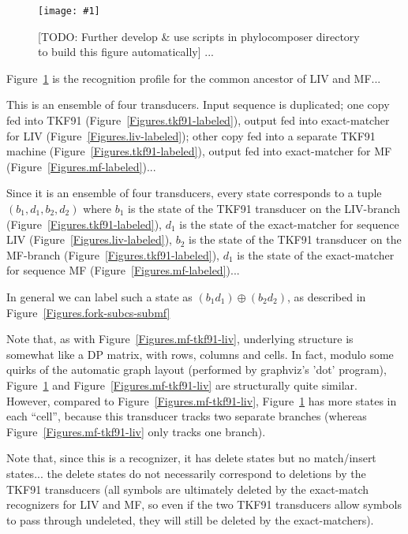 \documentclass{article}
\newcommand{\figref}[1]{Figure~\ref{Figures.#1}}
\newcommand{\figlabel}[1]{\label{Figures.#1}}
\newcommand{\todo}[1]{[TODO: #1]}
\newcommand{\easyfig}[4]{
\begin{figure}
\texttt{[image: \#1]}
\caption{ \figlabel{#3} #4}
\end{figure}}
\newcommand{\widepdffig}[2]{\easyfig{#1-fig.pdf}{width=\textwidth}{#1}{#2}}
\begin{document}
\widepdffig{fork-tkf91liv-tkf91mf}{
 \todo{Further develop \& use scripts in phylocomposer directory to build this figure automatically} ...}

\figref{fork-tkf91liv-tkf91mf} is the recognition profile for the common ancestor of LIV and MF...

This is an ensemble of four transducers.
Input sequence is duplicated;
one copy fed into TKF91 (\figref{tkf91-labeled}),
output fed into exact-matcher for LIV (\figref{liv-labeled});
other copy fed into a separate TKF91 machine (\figref{tkf91-labeled}),
output fed into exact-matcher for MF (\figref{mf-labeled})...

Since it is an ensemble of four transducers, every state corresponds to a tuple $(b_1,d_1,b_2,d_2)$
where
$b_1$ is the state of the TKF91 transducer on the LIV-branch (\figref{tkf91-labeled}),
$d_1$ is the state of the exact-matcher for sequence LIV (\figref{liv-labeled}),
$b_2$ is the state of the TKF91 transducer on the MF-branch (\figref{tkf91-labeled}),
$d_1$ is the state of the exact-matcher for sequence MF (\figref{mf-labeled})...

In general we can label such a state as $(b_1 d_1) \oplus (b_2 d_2)$,
as described in \figref{fork-subcs-submf}

Note that, as with \figref{mf-tkf91-liv},
underlying structure is somewhat like a DP matrix,
with rows, columns and cells.
In fact, modulo some quirks of the automatic graph layout (performed by graphviz's 'dot' program),
\figref{fork-tkf91liv-tkf91mf} and \figref{mf-tkf91-liv} are structurally quite similar.
However, compared to \figref{mf-tkf91-liv},
\figref{fork-tkf91liv-tkf91mf} has more states in each ``cell'',
because this transducer tracks two separate branches
(whereas \figref{mf-tkf91-liv} only tracks one branch).

Note that, since this is a recognizer, it has delete states but no match/insert states...
the delete states do not necessarily correspond to deletions by the TKF91 transducers
(all symbols are ultimately deleted by the exact-match recognizers for LIV and MF,
so even if the two TKF91 transducers allow symbols to pass through undeleted,
they will still be deleted by the exact-matchers).
\end{document}
